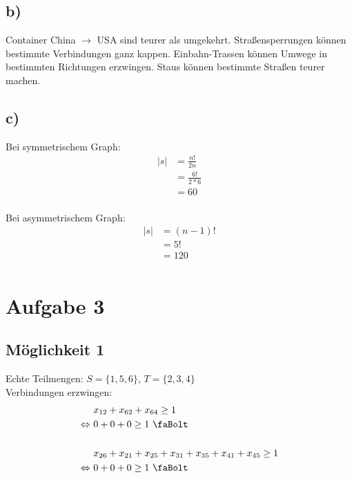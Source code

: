 \documentclass[a4paper,11pt]{article}
\begin{document}
\subsection*{b)}

Container China $\to$ USA sind teurer als umgekehrt. Straßensperrungen können bestimmte Verbindungen ganz kappen. Einbahn-Trassen können Umwege in bestimmten Richtungen erzwingen. Staus können bestimmte Straßen teurer machen. \\

\subsection*{c)}

Bei symmetrischem Graph: \\
\begin{align*}
    |s| &= \frac{n!}{2n} \\
        &= \frac{6!}{2*6} \\
        &= 60 \\
\end{align*}

Bei asymmetrischem Graph: \\
\begin{align*}
    |s| &= (n-1)! \\
        &= 5! \\
        &= 120 \\
\end{align*}

\section*{Aufgabe 3}

\subsection*{Möglichkeit 1}
Echte Teilmengen: $S = \{ 1, 5, 6 \}$, $T = \{ 2, 3, 4 \}$ \\

Verbindungen erzwingen:
\begin{align*}
    &x_{12} + x_{62} + x_{64} \ge 1 \\
    \Leftrightarrow ~& 0 + 0 + 0 \ge 1 ~\text{\faBolt} \\
    \\
    &x_{26} + x_{21} + x_{25} + x_{31} + x_{35} + x_{41} + x_{45} \ge 1 \\
    \Leftrightarrow ~& 0 + 0 + 0 \ge 1 ~\text{\faBolt} \\
\end{align*}
\end{document}
